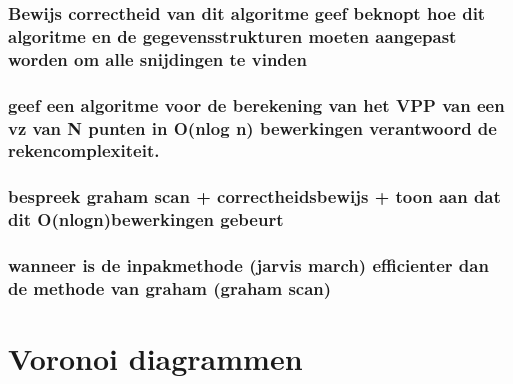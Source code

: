 \documentclass[12pt,a4paper]{article}
\begin{document}
\section{Bewijs correctheid van dit algoritme geef beknopt hoe dit algoritme en de gegevensstrukturen moeten aangepast worden om alle snijdingen te vinden}
\section{geef een algoritme voor de berekening van het VPP van een vz van N punten in O(nlog n) bewerkingen verantwoord de rekencomplexiteit.}
\section{bespreek graham scan + correctheidsbewijs + toon aan dat dit O(nlogn)bewerkingen gebeurt}
\section{wanneer is de inpakmethode (jarvis march) efficienter dan de methode van graham (graham scan)}
\fi

\part{Voronoi diagrammen}

\iffalse
\section{Bewijs: ``Een voronoi veelhoek van een punt $p_i$ is begrensd <=> $p_i$ element van $inw(CH(S))$'' Bespreek het nut van deze stelling.}
\section{Bewijs dat minimale doorloopboom deelverzameling is van de Delaunay triangulatie. Wat is het nut van deze eigenschap?}
\section{Bewijs: "Twee dichtste buren hebben een gemeenschappelijke voronoi zijde"}
\section{Geen een strategie en een hoog-niveau algoritme  voor het vinden van de maximale lege cirkel binnen de COV van een verzameling punten.}
\section{Bespreek de event punten in het algoritme van Fortune Welke acties moeten ondernomen worden?}
\fi
\end{document}
